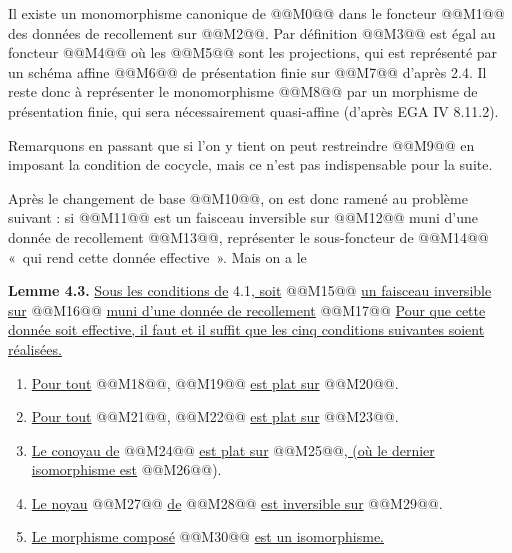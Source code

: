 
Il
existe un monomorphisme canonique de @@M0@@ dans le foncteur @@M1@@ des données de recollement sur @@M2@@. Par définition @@M3@@ est égal au foncteur @@M4@@ où les @@M5@@ sont les projections, qui est représenté par un schéma affine @@M6@@ de présentation finie sur @@M7@@ d'après 2.4. Il reste donc à représenter le monomorphisme
@@M8@@
par un morphisme de présentation finie, qui sera nécessairement quasi-affine (d'après EGA IV 8.11.2).

Remarquons en passant que si l'on y tient on peut restreindre @@M9@@ en imposant la condition de cocycle, mais ce n'est pas indispensable pour la suite.

Après le changement de base @@M10@@, on est donc ramené au problème suivant : si @@M11@@ est un faisceau inversible sur @@M12@@ muni d'une donnée de recollement @@M13@@, représenter le sous-foncteur de @@M14@@ «~qui rend cette donnée effective~». Mais on a le

\textbf{Lemme 4.3.} \uline{Sous les conditions de} 4.1\uline{, soit} @@M15@@ \uline{un faisceau inversible sur} @@M16@@ \uline{muni d'une donnée de recollement}
@@M17@@
\uline{Pour que cette donnée soit effective, il faut et il suffit que les cinq conditions suivantes soient réalisées.}
\begin{enumerate}[label=\arabic*)]
\item \uline{Pour tout} @@M18@@, @@M19@@ \uline{est plat sur} @@M20@@.
\item \uline{Pour tout} @@M21@@, @@M22@@ \uline{est plat sur} @@M23@@.
\item \uline{Le conoyau de} @@M24@@ \uline{est plat sur} @@M25@@\uline{, (où le dernier isomorphisme est} @@M26@@).
\item \uline{Le noyau} @@M27@@ \uline{de} @@M28@@ \uline{est inversible sur} @@M29@@.
\item \uline{Le morphisme composé} @@M30@@ \uline{est un isomorphisme.}
\end{enumerate}
